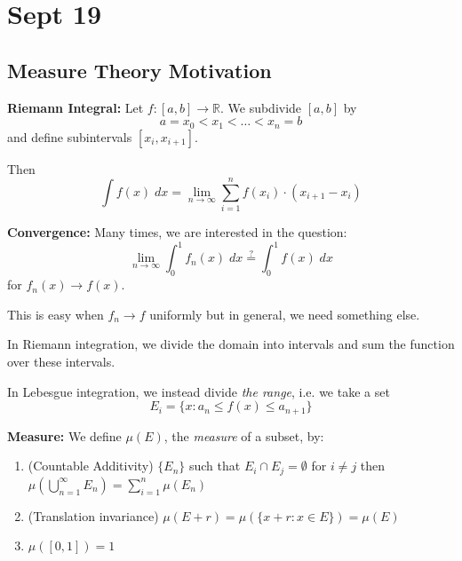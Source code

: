 \documentclass[12pt]{report}
\newcommand{\R}{\mathbb{R}}
\begin{document}
\section*{Sept 19}
    \subsection*{Measure Theory Motivation}
        \textbf{Riemann Integral:} Let $f: [a, b] \to \R$. We subdivide $[a, b]$ by 
        \[a = x_0 < x_1 < \dots < x_n = b\]
        and define subintervals $[x_i, x_{i+1}]$. 

        Then 
        \[\int f(x) \;dx = \lim_{n \to \infty}\sum_{i = 1}^{n} f(x_i)\cdot (x_{i+1} - x_i)\]

        \textbf{Convergence:} Many times, we are interested in the question: 
        \[\lim_{n \to \infty} \int_0^1 f_n(x)\; dx \overset{?}{=} \int_0^1 f(x)\; dx\]
        for $f_n(x) \to f(x)$. 

        This is easy when $f_n \to f$ uniformly but in general, we need something else. 

        In Riemann integration, we divide the domain into intervals and sum the function over these intervals.

        In Lebesgue integration, we instead divide \emph{the range}, i.e. we take a set 
        \[E_i = \{x: a_n \leq f(x)\leq a_{n+1}\}\] 

        \textbf{Measure:} We define $\mu(E)$, the \emph{measure} of a subset, by:
        \begin{enumerate}
            \item (Countable Additivity) $\{E_n\}$ such that $E_i \cap E_j = \emptyset$ for $i \neq j$ then $\mu(\bigcup_{n=1}^{\infty} E_n) = \sum_{i=1}^n \mu(E_n)$
            \item (Translation invariance) $\mu(E + r) = \mu(\{x + r: x \in E\})= \mu(E)$
            \item $\mu([0,1]) = 1$
        \end{enumerate} 
\end{document}
